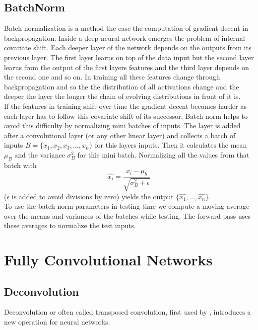 \subsection{BatchNorm} %
\label{sub:conepts:nn:batchnorm}
Batch normalization \citep{ioffe_batch_2015} is a method the ease the computation of gradient decent in backpropagation. Inside a deep neural network emerges the problem of internal covariate shift. Each deeper layer of the network depends on the outputs from its previous layer. The first layer learns on top of the data input but the second layer learns from the output of the first layers features and the third layer depends on the second one and so on. In training all these features change through backpropagation and so the the distribution of all activations change and the deeper the layer the longer the chain of evolving distributions in front of it is.\\
If the features in training shift over time the gradient decent becomes harder as each layer has to follow this covariate shift of its successor. Batch norm helps to avoid this difficulty by normalizing mini batches of inputs. The layer is added after a convolutional layer (or any other linear layer) and collects a batch of inputs $B = \{x_1, x_2, x_3, \dots, x_n\}$ for this layers inputs. Then it calculates the mean $\mu_B$ and the variance $\sigma_B^2$ for this mini batch. Normalizing all the values from that batch  with $$\hat{x_i} = \frac{x_i - \mu_b}{\sqrt{\sigma_B^2 + \epsilon}}$$ ($\epsilon$ is added to avoid divisions by zero) yields the output $\{\hat{x_1},\dots,\hat{x_n}\}$.\\
To use the batch norm parameters in testing time we compute a moving average over the means and variances of the batches while testing. The forward pass uses these averages to normalize the test inputs.

\section{Fully Convolutional Networks}
\label{sec:concepts:fcn}

\subsection{Deconvolution} %
\label{sub:conepts:fcn:deconv}
Deconvolution or often called transposed convolution, first used by \citet{zeiler_deconvolutional_2010}, introduces a new operation for neural networks.

